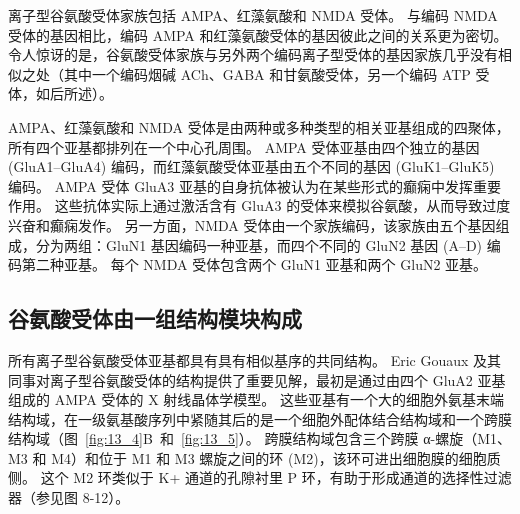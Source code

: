 离子型谷氨酸受体家族包括 AMPA、红藻氨酸和 NMDA 受体。
与编码 NMDA 受体的基因相比，编码 AMPA 和红藻氨酸受体的基因彼此之间的关系更为密切。
令人惊讶的是，谷氨酸受体家族与另外两个编码离子型受体的基因家族几乎没有相似之处（其中一个编码烟碱 ACh、GABA 和甘氨酸受体，另一个编码 ATP 受体，如后所述）。


AMPA、红藻氨酸和 NMDA 受体是由两种或多种类型的相关亚基组成的四聚体，所有四个亚基都排列在一个中心孔周围。
AMPA 受体亚基由四个独立的基因 (GluA1–GluA4) 编码，而红藻氨酸受体亚基由五个不同的基因 (GluK1–GluK5) 编码。
AMPA 受体 GluA3 亚基的自身抗体被认为在某些形式的癫痫中发挥重要作用。
这些抗体实际上通过激活含有 GluA3 的受体来模拟谷氨酸，从而导致过度兴奋和癫痫发作。
另一方面，NMDA 受体由一个家族编码，该家族由五个基因组成，分为两组：GluN1 基因编码一种亚基，而四个不同的 GluN2 基因 (A–D) 编码第二种亚基。
每个 NMDA 受体包含两个 GluN1 亚基和两个 GluN2 亚基。



\subsection{谷氨酸受体由一组结构模块构成}

所有离子型谷氨酸受体亚基都具有具有相似基序的共同结构。
Eric Gouaux 及其同事对离子型谷氨酸受体的结构提供了重要见解，最初是通过由四个 GluA2 亚基组成的 AMPA 受体的 X 射线晶体学模型。
这些亚基有一个大的细胞外氨基末端结构域，在一级氨基酸序列中紧随其后的是一个细胞外配体结合结构域和一个跨膜结构域（图~\ref{fig:13_4}B~和~\ref{fig:13_5}）。
跨膜结构域包含三个跨膜 α-螺旋（M1、M3 和 M4）和位于 M1 和 M3 螺旋之间的环 (M2)，该环可进出细胞膜的细胞质侧。
这个 M2 环类似于 K+ 通道的孔隙衬里 P 环，有助于形成通道的选择性过滤器（参见图 8-12）。


